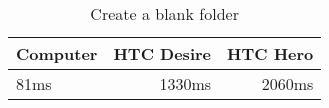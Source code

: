 \begin{table}
  \centering
  \caption{Create a blank folder}
  \begin{tabular}{ | l | r | r |}
    \hline
   \textbf{Computer} & \textbf{HTC Desire} & \textbf{HTC Hero} \\ \hline
    81ms  &1330ms     &2060ms    \\ \hline
  \end{tabular}
  \label{tbl:folder:createblank}
\end{table}
